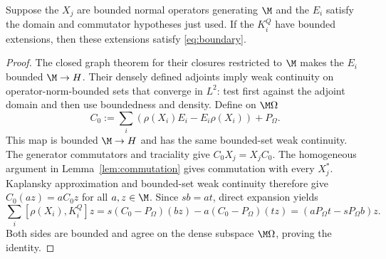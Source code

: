 \begin{lemma}\label{lem:fundamental}
Suppose the $X_j$ are bounded normal operators generating $\M$ and the $E_i$ satisfy the domain and commutator hypotheses just used.
If the $K_i^Q$ have bounded extensions, then these extensions satisfy \eqref{eq:boundary}.
\end{lemma}
\begin{proof}
The closed graph theorem for their closures restricted to $\M$ makes the $E_i$ bounded $\M\to H$.
Their densely defined adjoints imply weak continuity on operator-norm-bounded sets that converge in $L^2$: test first against the adjoint domain and then use boundedness and density.
Define on $\M\Omega$
\[
 C_0:=\sum_i(\rho(X_i)E_i-E_i\rho(X_i))+P_\Omega.
\]
This map is bounded $\M\to H$ and has the same bounded-set weak continuity.
The generator commutators and traciality give $C_0X_j=X_jC_0$.
The homogeneous argument in Lemma~\ref{lem:commutation} gives commutation with every $X_j^*$.
Kaplansky approximation and bounded-set weak continuity therefore give $C_0(az)=aC_0z$ for all $a,z\in\M$.
Since $sb=at$, direct expansion yields
\[
 \sum_i[\rho(X_i),K_i^Q]z
 =s(C_0-P_\Omega)(bz)-a(C_0-P_\Omega)(tz)
 =(aP_\Omega t-sP_\Omega b)z.
\]
Both sides are bounded and agree on the dense subspace $\M\Omega$, proving the identity.
\end{proof}

